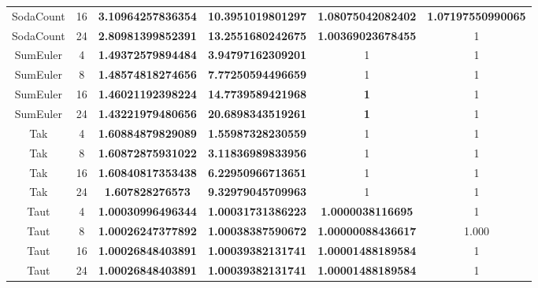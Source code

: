 \begin{table}
\begin{tabular}{c|c|S|S|S|S}
SodaCount & 16 & \bfseries 3.10964257836354  & \bfseries 10.3951019801297  & \bfseries 1.08075042082402  & \bfseries 1.07197550990065  \\
SodaCount & 24 & \bfseries 2.80981399852391  & \bfseries 13.2551680242675  & \bfseries 1.00369023678455  &  1  \\
SumEuler & 4 & \bfseries 1.49372579894484  & \bfseries 3.94797162309201  &  1  &  1  \\
SumEuler & 8 & \bfseries 1.48574818274656  & \bfseries 7.77250594496659  &  1  &  1  \\
SumEuler & 16 & \bfseries 1.46021192398224  & \bfseries 14.7739589421968  & \bfseries 1  &  1  \\
SumEuler & 24 & \bfseries 1.43221979480656  & \bfseries 20.6898343519261  & \bfseries 1  &  1  \\
Tak & 4 & \bfseries 1.60884879829089  & \bfseries 1.55987328230559  &  1  &  1  \\
Tak & 8 & \bfseries 1.60872875931022  & \bfseries 3.11836989833956  &  1  &  1  \\
Tak & 16 & \bfseries 1.60840817353438  & \bfseries 6.22950966713651  &  1  &  1  \\
Tak & 24 & \bfseries 1.607828276573  & \bfseries 9.32979045709963  &  1  &  1  \\
Taut & 4 & \bfseries 1.00030996496344  & \bfseries 1.00031731386223  & \bfseries 1.0000038116695  &  1  \\
Taut & 8 & \bfseries 1.00026247377892  & \bfseries 1.00038387590672  & \bfseries 1.00000088436617  &  1.000  \\
Taut & 16 & \bfseries 1.00026848403891  & \bfseries 1.00039382131741  & \bfseries 1.00001488189584  &  1  \\
Taut & 24 & \bfseries 1.00026848403891  & \bfseries 1.00039382131741  & \bfseries 1.00001488189584  &  1  \\




\end{tabular}
\end{table}
